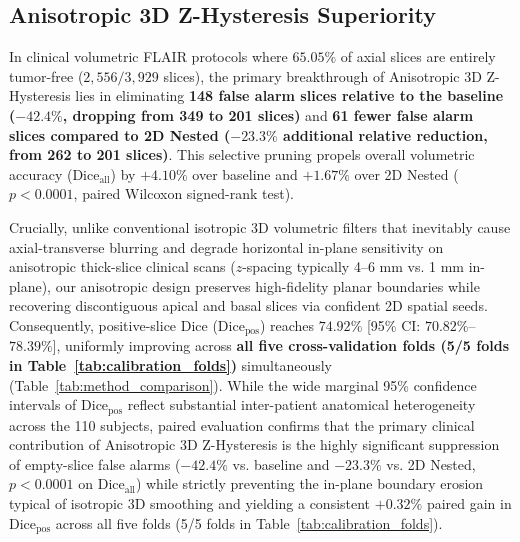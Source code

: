 \documentclass[preprint,3p,times,onecolumn]{elsarticle}
\begin{document}
\subsection{Anisotropic 3D Z-Hysteresis Superiority}
In clinical volumetric FLAIR protocols where $65.05\%$ of axial slices are entirely tumor-free ($2,556 / 3,929$ slices), the primary breakthrough of Anisotropic 3D Z-Hysteresis lies in eliminating \textbf{148 false alarm slices relative to the baseline ($-42.4\%$, dropping from 349 to 201 slices)} and \textbf{61 fewer false alarm slices compared to 2D Nested ($-23.3\%$ additional relative reduction, from 262 to 201 slices)}. This selective pruning propels overall volumetric accuracy ($\text{Dice}_{\text{all}}$) by $+4.10\%$ over baseline and $+1.67\%$ over 2D Nested ($p < 0.0001$, paired Wilcoxon signed-rank test).

Crucially, unlike conventional isotropic 3D volumetric filters that inevitably cause axial-transverse blurring and degrade horizontal in-plane sensitivity on anisotropic thick-slice clinical scans ($z$-spacing typically 4--6 mm vs. 1 mm in-plane), our anisotropic design preserves high-fidelity planar boundaries while recovering discontiguous apical and basal slices via confident 2D spatial seeds. Consequently, positive-slice Dice ($\text{Dice}_{\text{pos}}$) reaches $74.92\%$ [95\% CI: $70.82\%$--$78.39\%$], uniformly improving across \textbf{all five cross-validation folds (5/5 folds in Table~\ref{tab:calibration_folds})} simultaneously (Table~\ref{tab:method_comparison}). While the wide marginal 95\% confidence intervals of $\text{Dice}_{\text{pos}}$ reflect substantial inter-patient anatomical heterogeneity across the 110 subjects, paired evaluation confirms that the primary clinical contribution of Anisotropic 3D Z-Hysteresis is the highly significant suppression of empty-slice false alarms ($-42.4\%$ vs. baseline and $-23.3\%$ vs. 2D Nested, $p < 0.0001$ on $\text{Dice}_{\text{all}}$) while strictly preventing the in-plane boundary erosion typical of isotropic 3D smoothing and yielding a consistent $+0.32\%$ paired gain in $\text{Dice}_{\text{pos}}$ across all five folds (5/5 folds in Table~\ref{tab:calibration_folds}).
\end{document}
